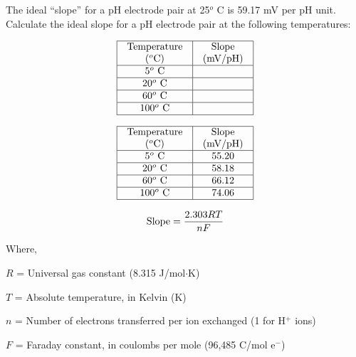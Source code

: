 

The ideal ``slope'' for a pH electrode pair at 25$^{o}$ C is 59.17 mV per pH unit.  Calculate the ideal slope for a pH electrode pair at the following temperatures:


$$\vbox{\offinterlineskip
\halign{\strut
\vrule \quad\hfil # \ \hfil & 
\vrule \quad\hfil # \ \hfil \vrule \cr
\noalign{\hrule}
%
Temperature & Slope \cr
%
($^{o}$C) & (mV/pH) \cr
%
\noalign{\hrule}
%
5$^{o}$ C &  \cr
%
\noalign{\hrule}
%
20$^{o}$ C &  \cr
%
\noalign{\hrule}
%
60$^{o}$ C &  \cr
%
\noalign{\hrule}
%
100$^{o}$ C &  \cr
%
\noalign{\hrule}
} %
}$$ %








$$\vbox{\offinterlineskip
\halign{\strut
\vrule \quad\hfil # \ \hfil & 
\vrule \quad\hfil # \ \hfil \vrule \cr
\noalign{\hrule}
%
Temperature & Slope \cr
%
($^{o}$C) & (mV/pH) \cr
%
\noalign{\hrule}
%
5$^{o}$ C & 55.20 \cr
%
\noalign{\hrule}
%
20$^{o}$ C & 58.18 \cr
%
\noalign{\hrule}
%
60$^{o}$ C & 66.12 \cr
%
\noalign{\hrule}
%
100$^{o}$ C & 74.06 \cr
%
\noalign{\hrule}
} %
}$$ %







$$\hbox{Slope} = {{2.303 R T} \over {nF}}$$

\noindent
Where,

$R$ = Universal gas constant (8.315 J/mol$\cdot$K)

$T$ = Absolute temperature, in Kelvin (K)

$n$ = Number of electrons transferred per ion exchanged (1 for H$^{+}$ ions)

$F$ = Faraday constant, in coulombs per mole (96,485 C/mol e$^{-}$)

\vskip 10pt





